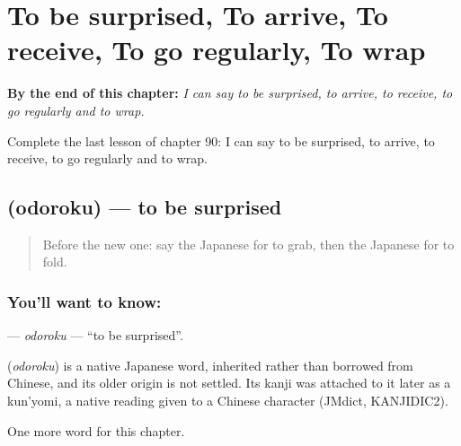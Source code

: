 
\chapter{To be surprised, To arrive, To receive, To go regularly, To wrap}
\label{ch:ja-to-be-surprised-to-arrive-to-receive-to-go-regularly-to-wrap}

\begin{chapteropening}
\textbf{By the end of this chapter:} \emph{I can say to be surprised, to arrive, to receive, to go regularly and to wrap.}

Complete the last lesson of chapter 90: I can say to be surprised, to arrive, to receive, to go regularly and to wrap.
\end{chapteropening}

\section[\texorpdfstring{\ja{おどろく} (odoroku)}{おどろく (odoroku)}]{ (odoroku) — to be surprised}

\label{lesson:JA-C90-odoroku}



\begin{quote}
Before the new one: say the Japanese for to grab, then the Japanese for to fold.
\end{quote}

\subsection*{You'll want to know: }
\textbf{} — \emph{odoroku} — \textquotedblleft{}to be surprised\textquotedblright{}.

\begin{cousinweb}
\textbf{} (\emph{odoroku}) is a native Japanese word, inherited rather than borrowed from Chinese, and its older origin is not settled. Its kanji was attached to it later as a kun'yomi, a native reading given to a Chinese character (JMdict, KANJIDIC2).
\end{cousinweb}

\begin{grammarlens}[title={What you've built}]
One more word for this chapter.
\end{grammarlens}

